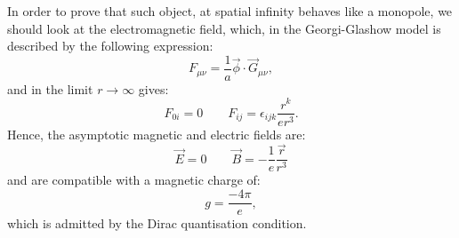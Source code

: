 In order to prove that such object, at spatial infinity behaves like a monopole, we should look at the electromagnetic field, which, in the Georgi-Glashow model is described by the following expression: 
\begin{equation}
 F_{\mu \nu} = \frac{1}{a} \vec{\phi} \cdot \vec{G}_{\mu \nu },
\end{equation}
and in the limit $r \to \infty$  gives:
\begin{equation}
F_{0i}= 0 \qquad F_{ij}= \epsilon_{ijk} \frac{r^k}{e r^3}.
\end{equation}
Hence, the asymptotic magnetic and electric fields are: 
\begin{equation}
\vec{E}=0 \qquad  \vec{B}= - \frac{1}{e} \frac{\vec{r}}{r^3}
\end{equation}
and are compatible with a magnetic charge of: 
\begin{equation}
g= \frac{-4\pi}{e},
\end{equation}
which is admitted by the Dirac quantisation condition.

